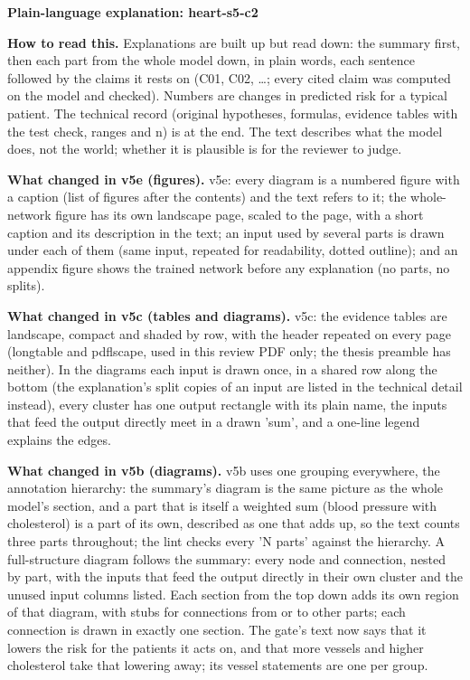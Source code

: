 \documentclass[a4paper,10pt]{article}
\begin{document}
\begin{center}{\Large\bfseries Plain-language explanation: heart-s5-c2\par}\vspace{2mm}{\small AI-assisted drafts for review. Nothing here has been verified by a person.\par}\end{center}
\noindent\textbf{How to read this.} Explanations are built up but read down: the summary first, then each part from the whole model down, in plain words, each sentence followed by the claims it rests on (C01, C02, \ldots; every cited claim was computed on the model and checked). Numbers are changes in predicted risk for a typical patient. The technical record (original hypotheses, formulas, evidence tables with the test check, ranges and n) is at the end. The text describes what the model does, not the world; whether it is plausible is for the reviewer to judge.
\par\medskip\noindent\textbf{What changed in v5e (figures).} v5e: every diagram is a numbered figure with a caption (list of figures after the contents) and the text refers to it; the whole-network figure has its own landscape page, scaled to the page, with a short caption and its description in the text; an input used by several parts is drawn under each of them (same input, repeated for readability, dotted outline); and an appendix figure shows the trained network before any explanation (no parts, no splits).
\par\medskip\noindent\textbf{What changed in v5c (tables and diagrams).} v5c: the evidence tables are landscape, compact and shaded by row, with the header repeated on every page (longtable and pdflscape, used in this review PDF only; the thesis preamble has neither). In the diagrams each input is drawn once, in a shared row along the bottom (the explanation's split copies of an input are listed in the technical detail instead), every cluster has one output rectangle with its plain name, the inputs that feed the output directly meet in a drawn 'sum', and a one-line legend explains the edges.
\par\medskip\noindent\textbf{What changed in v5b (diagrams).} v5b uses one grouping everywhere, the annotation hierarchy: the summary's diagram is the same picture as the whole model's section, and a part that is itself a weighted sum (blood pressure with cholesterol) is a part of its own, described as one that adds up, so the text counts three parts throughout; the lint checks every 'N parts' against the hierarchy. A full-structure diagram follows the summary: every node and connection, nested by part, with the inputs that feed the output directly in their own cluster and the unused input columns listed. Each section from the top down adds its own region of that diagram, with stubs for connections from or to other parts; each connection is drawn in exactly one section. The gate's text now says that it lowers the risk for the patients it acts on, and that more vessels and higher cholesterol take that lowering away; its vessel statements are one per group.
\end{document}
